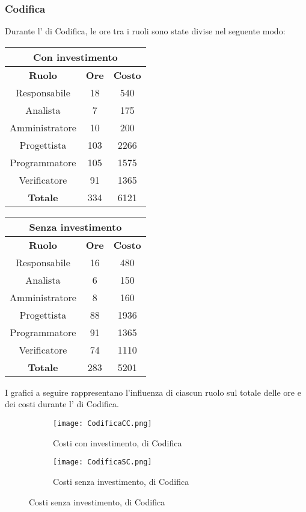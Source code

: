 \documentclass{scalatekids-article}
\begin{document}
\subsubsection{Codifica}
Durante l' di Codifica, le ore tra i ruoli sono state divise nel seguente modo:
\begin{center}
  \normalsize
  \begin{tabular}{| c | c | c |}
    \hline
    \multicolumn{3}{|c|}{\textbf{Con investimento}}\\
    \hline
    \textbf{Ruolo} & \textbf{Ore} & \textbf{Costo}\\
    \hline
    Responsabile & 18 & 540 \\
    Analista & 7 & 175\\
    Amministratore & 10 & 200\\
    Progettista & 103 & 2266\\
    Programmatore & 105 & 1575\\
    Verificatore & 91 & 1365\\
    \hline
    \textbf{Totale} & 334 & 6121\\
    \hline
  \end{tabular}
  \qquad
  \begin{tabular}{| c | c | c |}
    \hline
    \multicolumn{3}{|c|}{\textbf{Senza investimento}}\\
    \hline
    \textbf{Ruolo} & \textbf{Ore} & \textbf{Costo}\\
    \hline
    Responsabile & 16 & 480\\
    Analista & 6 & 150\\
    Amministratore & 8 & 160\\
    Progettista & 88 & 1936\\
    Programmatore & 91 & 1365\\
    Verificatore & 74 & 1110\\
    \hline
    \textbf{Totale} & 283 & 5201\\
    \hline
  \end{tabular}
\end{center}
I grafici a seguire rappresentano l'influenza di ciascun ruolo sul totale delle ore e dei costi durante l' di Codifica.
\begin{figure}[H]
  \begin{subfigure}[H]{0.47\textwidth}
    \texttt{[image: CodificaCC.png]}
    \caption*{Costi con investimento,  di Codifica}
  \end{subfigure}
  \qquad
  \begin{subfigure}[H]{0.47\textwidth}
    \texttt{[image: CodificaSC.png]}
    \caption*{Costi senza investimento,  di Codifica}
  \end{subfigure}
\end{figure}
\newpage
\end{document}
